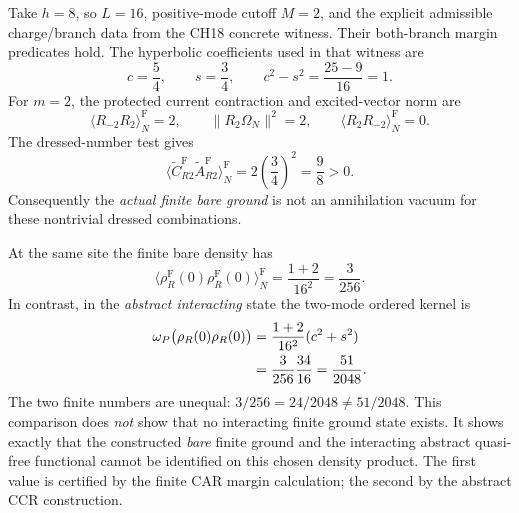 \begin{example}
\label{ex:ch19-comp-16-sites}
Take $h=8$, so $L=16$, positive-mode cutoff $M=2$, and the explicit
admissible charge/branch data from the CH18 concrete witness.  Their
both-branch margin predicates hold.  The hyperbolic coefficients used
in that witness are
\begin{equation}
 c=\frac54,\qquad s=\frac34,
 \qquad c^2-s^2=\frac{25-9}{16}=1.
 \label{eq:ch19-comp-example-pair}
\end{equation}
For $m=2$, the protected current contraction and excited-vector norm
are
\begin{equation}
 \langle R_{-2}R_2\rangle_N^{\mathrm F}=2,
 \qquad\|R_2\Omega_N\|^2=2,
 \qquad\langle R_2R_{-2}\rangle_N^{\mathrm F}=0.
 \label{eq:ch19-comp-example-bare}
\end{equation}
The dressed-number test gives
\begin{equation}
 \bigl\langle\widetilde C_{R2}^{\mathrm F}
 \widetilde A_{R2}^{\mathrm F}\bigr\rangle_N^{\mathrm F}
 =2\left(\frac34\right)^2=\frac98>0.
 \label{eq:ch19-comp-example-dressed}
\end{equation}
Consequently the \emph{actual finite bare ground} is not an
annihilation vacuum for these nontrivial dressed combinations.

At the same site the finite bare density has
\begin{equation}
 \langle\rho_R^{\mathrm F}(0)\rho_R^{\mathrm F}(0)
 \rangle_N^{\mathrm F}
 =\frac{1+2}{16^2}=\frac3{256}.
 \label{eq:ch19-comp-example-free}
\end{equation}
In contrast, in the \emph{abstract interacting} state the two-mode
ordered kernel is
\begin{align}
 \omega_P\bigl(\rho_R(0)\rho_R(0)\bigr)
 &=\frac{1+2}{16^2}(c^2+s^2)\notag\\
 &=\frac3{256}\frac{34}{16}
 =\frac{51}{2048}.
 \label{eq:ch19-comp-example-abstract}
\end{align}
The two finite numbers are unequal:
$3/256=24/2048\ne51/2048$.  This comparison does \emph{not}
show that no interacting finite ground state exists.  It shows exactly
that the constructed \emph{bare} finite ground and the interacting
abstract quasi-free functional cannot be identified on this chosen
density product.  The first value is certified by the finite CAR
margin calculation; the second by the abstract CCR construction.
\end{example}

